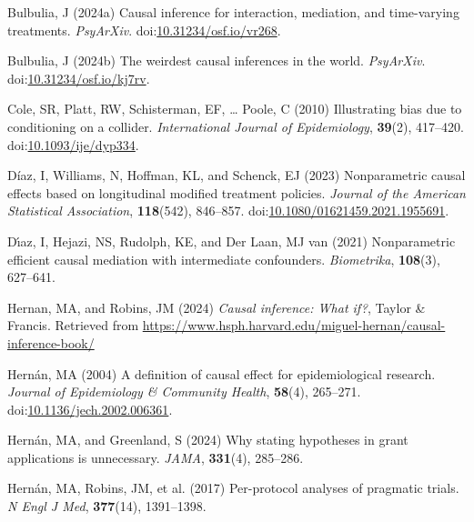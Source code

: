 \documentclass[
  single column]{article}
\newlength{\cslhangindent}
\newenvironment{CSLReferences}[2] %
 {\begin{list}{}{%
  \setlength{\itemindent}{0pt}
  \setlength{\leftmargin}{0pt}
  \setlength{\parsep}{0pt}
  \ifodd #1
   \setlength{\leftmargin}{\cslhangindent}
   \setlength{\itemindent}{-1\cslhangindent}
  \fi
  \setlength{\itemsep}{#2\baselineskip}}}
 {\end{list}}
\begin{document}
\label{refs}
\begin{CSLReferences}{1}{0}
Bulbulia, J (2024a) Causal inference for interaction, mediation, and
time-varying treatments. \emph{PsyArXiv}.
doi:\href{https://doi.org/10.31234/osf.io/vr268}{10.31234/osf.io/vr268}.

Bulbulia, J (2024b) The weirdest causal inferences in the world.
\emph{PsyArXiv}.
doi:\href{https://doi.org/10.31234/osf.io/kj7rv}{10.31234/osf.io/kj7rv}.

Cole, SR, Platt, RW, Schisterman, EF, \ldots{} Poole, C (2010)
Illustrating bias due to conditioning on a collider. \emph{International
Journal of Epidemiology}, \textbf{39}(2), 417--420.
doi:\href{https://doi.org/10.1093/ije/dyp334}{10.1093/ije/dyp334}.

Díaz, I, Williams, N, Hoffman, KL, and Schenck, EJ (2023) Nonparametric
causal effects based on longitudinal modified treatment policies.
\emph{Journal of the American Statistical Association},
\textbf{118}(542), 846--857.
doi:\href{https://doi.org/10.1080/01621459.2021.1955691}{10.1080/01621459.2021.1955691}.

Dı́az, I, Hejazi, NS, Rudolph, KE, and Der Laan, MJ van (2021)
Nonparametric efficient causal mediation with intermediate confounders.
\emph{Biometrika}, \textbf{108}(3), 627--641.

Hernan, MA, and Robins, JM (2024) \emph{Causal inference: What if?},
Taylor \& Francis. Retrieved from
\url{https://www.hsph.harvard.edu/miguel-hernan/causal-inference-book/}

Hernán, MA (2004) A definition of causal effect for epidemiological
research. \emph{Journal of Epidemiology \& Community Health},
\textbf{58}(4), 265--271.
doi:\href{https://doi.org/10.1136/jech.2002.006361}{10.1136/jech.2002.006361}.

Hernán, MA, and Greenland, S (2024) Why stating hypotheses in grant
applications is unnecessary. \emph{JAMA}, \textbf{331}(4), 285--286.

Hernán, MA, Robins, JM, et al. (2017) Per-protocol analyses of pragmatic
trials. \emph{N Engl J Med}, \textbf{377}(14), 1391--1398.


\end{CSLReferences}
\end{document}
